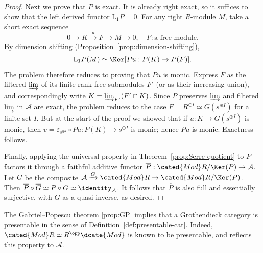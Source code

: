 \begin{proof}
	Next we prove that $P$ is exact. It is already right exact, so it suffices to show that the left derived functor $\mathrm{L}_1P=0$. For any right $R$-module $M$, take a short exact sequence
	\[ 0 \to K \xrightarrow{u} F \to M \to 0, \quad F: \text{a free module}. \]
	By dimension shifting (Proposition~\ref{prop:dimension-shifting}),
	\[ \mathrm{L}_1 P (M) \simeq \Ker[Pu: P(K) \to P(F)]. \]
	The problem therefore reduces to proving that $Pu$ is monic. Express $F$ as the filtered $\varinjlim$ of its finite-rank free submodules $F'$ (or as their increasing union), and correspondingly write $K=\varinjlim_{F'}(F'\cap K)$. Since $P$ preserves $\varinjlim$ and filtered $\varinjlim$ in $\mathcal{A}$ are exact, the problem reduces to the case
	$F=R^{\oplus I}\simeq G(s^{\oplus I})$ for a finite set $I$. But at the start of the proof we showed that if
	$u:K\to G(s^{\oplus I})$ is monic, then
	$v=\varepsilon_{s^{\oplus I}}\circ Pu:P(K)\to s^{\oplus I}$ is monic; hence $Pu$ is monic. Exactness follows.

	Finally, applying the universal property in Theorem~\ref{prop:Serre-quotient} to $P$ factors it through a faithful additive functor
	$\overline P:\cated{Mod}R/\Ker(P)\to\mathcal{A}$. Let $\overline G$ be the composite
	$\mathcal{A}\xrightarrow{G}\cated{Mod}R\to\cated{Mod}R/\Ker(P)$.
	Then
	$\overline P\circ\overline G\simeq P\circ G\simeq\identity_{\mathcal{A}}$.
	It follows that $\overline P$ is also full and essentially surjective, with $\overline G$ as a quasi-inverse, as desired.
\end{proof}

\begin{remark}
	The Gabriel--Popescu theorem \ref{prop:GP} implies that a Grothendieck category is presentable in the sense of Definition~\ref{def:presentable-cat}. Indeed, $\cated{Mod}R\simeq R^{\opp}\dcate{Mod}$ is known to be presentable, and \cite[Corollary 1.40]{AR94} reflects this property to $\mathcal{A}$.
\end{remark}
